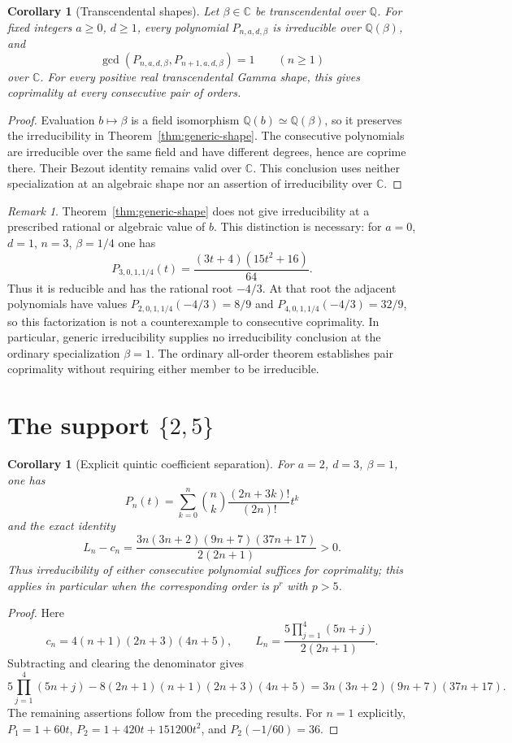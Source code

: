 \documentclass[11pt]{article}
\newtheorem{corollary}[theorem]{Corollary}
\theoremstyle{remark}
\newtheorem{remark}[theorem]{Remark}
\newcommand{\Q}{\mathbb Q}
\newcommand{\C}{\mathbb C}
\begin{document}
\begin{corollary}[Transcendental shapes]\label{cor:transcendental-shape}
Let $\beta\in\C$ be transcendental over $\Q$.
For fixed integers $a\ge0$, $d\ge1$, every polynomial
$P_{n,a,d,\beta}$ is irreducible over $\Q(\beta)$, and
\[
 \gcd(P_{n,a,d,\beta},P_{n+1,a,d,\beta})=1
 \qquad(n\ge1)
\]
over $\C$.
For every positive real transcendental Gamma shape, this gives
coprimality at every consecutive pair of orders.
\end{corollary}
\begin{proof}
Evaluation $b\mapsto\beta$ is a field isomorphism
$\Q(b)\simeq\Q(\beta)$, so it preserves the irreducibility in
Theorem~\ref{thm:generic-shape}.
The consecutive polynomials are irreducible over the same field and
have different degrees, hence are coprime there.
Their Bezout identity remains valid over $\C$.
This conclusion uses neither specialization at an algebraic shape
nor an assertion of irreducibility over $\C$.
\end{proof}

\begin{remark}\label{rem:algebraic-specialization}
Theorem~\ref{thm:generic-shape} does not give irreducibility at a
prescribed rational or algebraic value of $b$. This distinction is
necessary: for $a=0$, $d=1$, $n=3$, $\beta=1/4$ one has
\[
 P_{3,0,1,1/4}(t)=\frac{(3t+4)(15t^2+16)}{64}.
\]
Thus it is reducible and has the rational root $-4/3$.
At that root the adjacent polynomials have values
$P_{2,0,1,1/4}(-4/3)=8/9$ and
$P_{4,0,1,1/4}(-4/3)=32/9$, so this factorization is not a
counterexample to consecutive coprimality.
In particular, generic irreducibility supplies no irreducibility
conclusion at the ordinary specialization $\beta=1$. The ordinary
all-order theorem establishes pair coprimality without requiring
either member to be irreducible.
\end{remark}

\section{The support \texorpdfstring{$\{2,5\}$}{2,5}}

\begin{corollary}[Explicit quintic coefficient separation]\label{cor:quintic}
For $a=2$, $d=3$, $\beta=1$, one has
\[
 P_n(t)=\sum_{k=0}^n\binom nk\frac{(2n+3k)!}{(2n)!}t^k
\]
and the exact identity
\[
 L_n-c_n
 =\frac{3n(3n+2)(9n+7)(37n+17)}{2(2n+1)}>0 .
\]
Thus irreducibility of either consecutive polynomial suffices for
coprimality; this applies in particular when the corresponding
order is $p^r$ with $p>5$.
\end{corollary}
\begin{proof}
Here
\[
 c_n=4(n+1)(2n+3)(4n+5),\qquad
 L_n=\frac{5\prod_{j=1}^4(5n+j)}{2(2n+1)}.
\]
Subtracting and clearing the denominator gives
\[
 5\prod_{j=1}^4(5n+j)
 -8(2n+1)(n+1)(2n+3)(4n+5)
 =3n(3n+2)(9n+7)(37n+17).
\]
The remaining assertions follow from the preceding results.
For $n=1$ explicitly, $P_1=1+60t$,
$P_2=1+420t+151200t^2$, and $P_2(-1/60)=36$.
\end{proof}
\end{document}
